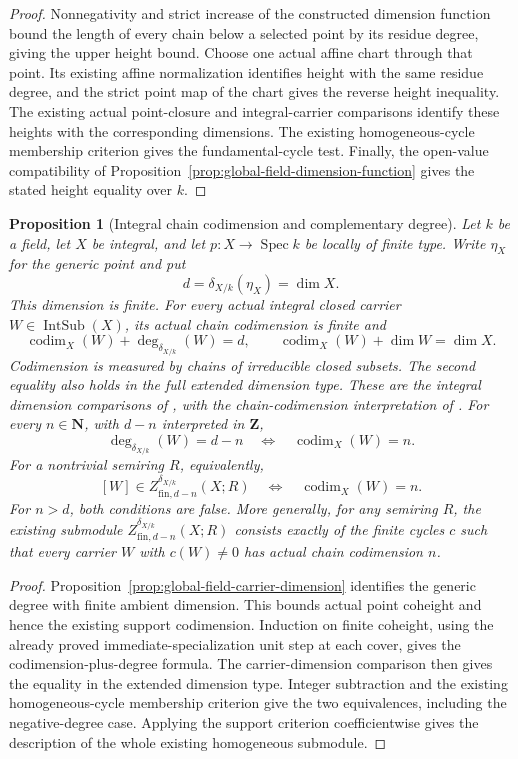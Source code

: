 \documentclass[11pt]{article}
\newtheorem{proposition}[theorem]{Proposition}
\theoremstyle{definition}
\theoremstyle{remark}
\DeclareMathOperator{\Spec}{Spec}
\begin{document}
\begin{proof}
Nonnegativity and strict increase of the constructed dimension function
bound the length of every chain below a selected point by its residue
degree, giving the upper height bound. Choose one actual affine chart
through that point. Its existing affine normalization identifies height
with the same residue degree, and the strict point map of the chart
gives the reverse height inequality.
The existing actual point-closure and integral-carrier comparisons
identify these heights with the corresponding dimensions. The existing
homogeneous-cycle membership criterion gives the fundamental-cycle test.
Finally, the open-value compatibility of
Proposition~\ref{prop:global-field-dimension-function} gives the stated
height equality over \(k\).
\end{proof}

\begin{proposition}[Integral chain codimension and complementary degree]
\label{prop:integral-field-codimension}
Let \(k\) be a field, let \(X\) be integral, and let
\(p:X\to\Spec k\) be locally of finite type. Write \(\eta_X\)
for the generic point and put
\[
  d=\delta_{X/k}(\eta_X)=\dim X.
\]
This dimension is finite. For every actual integral closed carrier
\(W\in\operatorname{IntSub}(X)\), its actual chain codimension is
finite and
\[
  \operatorname{codim}_X(W)+\deg_{\delta_{X/k}}(W)=d,
  \qquad
  \operatorname{codim}_X(W)+\dim W=\dim X.
\]
Codimension is measured by chains of irreducible closed subsets. The second equality
also holds in the full extended dimension type. These are the integral
dimension comparisons of \cite{StacksAlgebraicSchemeDimension}, with
the chain-codimension interpretation of
\cite{StacksCodimensionStalkDimension}.
For every \(n\in\mathbf N\), with \(d-n\) interpreted in
\(\mathbf Z\),
\[
  \deg_{\delta_{X/k}}(W)=d-n
  \quad\Longleftrightarrow\quad
  \operatorname{codim}_X(W)=n.
\]
For a nontrivial semiring \(R\), equivalently,
\[
  [W]\in Z^{\delta_{X/k}}_{\mathrm{fin},d-n}(X;R)
  \quad\Longleftrightarrow\quad
  \operatorname{codim}_X(W)=n.
\]
For \(n>d\), both conditions are false. More generally, for any semiring \(R\), the
existing submodule \(Z^{\delta_{X/k}}_{\mathrm{fin},d-n}(X;R)\)
consists exactly of the finite cycles \(c\) such that every carrier
\(W\) with \(c(W)\ne0\) has actual chain codimension \(n\).
\end{proposition}

\begin{proof}
Proposition~\ref{prop:global-field-carrier-dimension} identifies the
generic degree with finite ambient dimension. This bounds actual
point coheight and hence the existing support codimension.
Induction on finite coheight, using the already proved
immediate-specialization unit step at each cover, gives the
codimension-plus-degree formula. The carrier-dimension comparison
then gives the equality in the extended dimension type. Integer
subtraction and the existing homogeneous-cycle membership criterion
give the two equivalences, including the negative-degree case.
Applying the support criterion coefficientwise gives the description
of the whole existing homogeneous submodule.
\end{proof}
\end{document}
